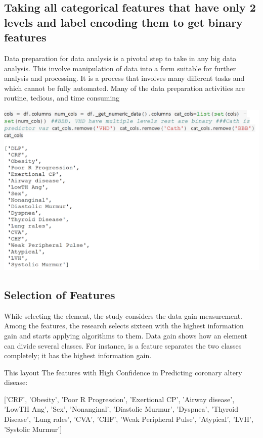 \documentclass[sigconf]{acmart}
\begin{document}
\subsection{Taking all categorical features that have only 2 levels and label encoding them to get binary features}

Data preparation for data analysis is a pivotal step to take in any big data analysis. This involve manipulation of data into a form suitable for further analysis and processing. It is a process that involves many different tasks and which cannot be fully automated. Many of the data preparation activities are routine, tedious, and time consuming

\includegraphics[width=0.95\columnwidth]{images/Untitled3.png}

\subsection{Selection of Features}

While selecting the element, the study considers the data gain measurement. Among the features, the research selects sixteen with the highest information gain and starts applying algorithms to them. Data gain shows how an element can divide several classes. For instance, is a feature separates the two classes completely; it has the highest information gain.

This layout The features with High Confidence in Predicting coronary altery disease:


['CRF',
    'Obesity',
    'Poor R Progression',
    'Exertional CP',
    'Airway disease',
    'LowTH Ang',
    'Sex',
    'Nonanginal',
    'Diastolic Murmur',
    'Dyspnea',
    'Thyroid Disease',
   'Lung rales',
    'CVA',
    'CHF',
    'Weak Peripheral Pulse',
    'Atypical',
    'LVH',
    'Systolic Murmur']
\end{document}
